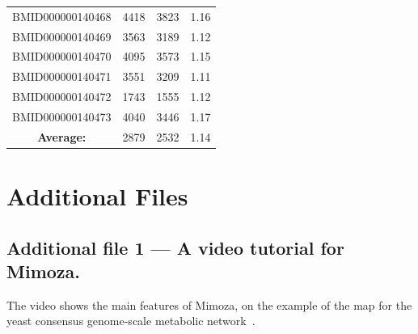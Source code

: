 \documentclass{bmcart}
\begin{document}
\begin{backmatter}
\begin{center}
\begin{longtable}{c|c|c|c}
BMID000000140468 & 4418 & 3823 & 1.16 \\
BMID000000140469 & 3563 & 3189 & 1.12 \\
BMID000000140470 & 4095 & 3573 & 1.15 \\
BMID000000140471 & 3551 & 3209 & 1.11 \\
BMID000000140472 & 1743 & 1555 & 1.12 \\
BMID000000140473 & 4040 & 3446 & 1.17 \\
 \hline
\textbf{Average:} & 2879 & 2532 & 1.14 \\
\hline
\end{longtable}
\end{center}


\section*{Additional Files}
  \subsection*{Additional file 1 --- A video tutorial for Mimoza.}
  The video shows the main features of Mimoza, on the example of the map for the yeast consensus genome-scale metabolic network~\cite{Herrgard2008}.


\end{backmatter}
\end{document}
